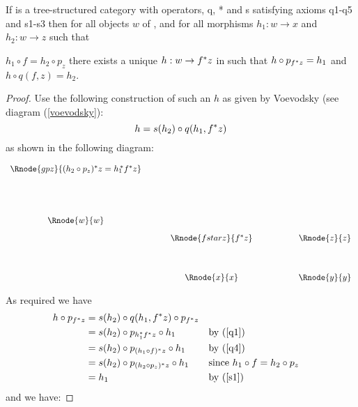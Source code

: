 \documentclass[10pt,a4paper]{scrartcl}
\begin{document}
\begin{lemma}
 If  is a tree-structured category with operators, q, * and s satisfying
axioms q1-q5 and s1-s3 then for all objects $w$ of , and for all
morphisms $h_1: w \rightarrow x$ and $h_2: w \rightarrow z$  such that

$h_1 \circ f = h_2 \circ p_z$ 
there exists a unique $h:w \rightarrow f ^* z$ in    such that
$h \circ p_{f ^* z} = h_1$ and $h \circ q(f,z) = h_2$.
\end{lemma}
\begin{proof}

Use the following construction of such an $h$ as given by Voevodsky  (see diagram (\ref{voevodsky}):
\begin{equation}
h = s(h_2) \circ q(h_1,f ^* z)
\end{equation}
as shown in the following diagram:
\vspace{3mm}
\begin{center}
\begin{equation}
\label{voevodsky}
\begin{array}{cp{0.5cm}cp{1.2cm}c}
\Rnode{gpz}{(h_2 \circ p_z)\sub z = {h_1} \kern-3pt \sub f \sub z} &&    &&   \\ [1.7cm]
\Rnode{w}{w} &&                     &&           \\ [0.3cm]
             &&\Rnode{fstarz}{f^*z} && \Rnode{z}{z}\\ [1.2cm]
             &&\Rnode{x}{x}         && \Rnode{y}{y}
\end{array}
\end{equation}
\setlength{\arrnodesepA}{3pt}
\end{center}
\noindent
As required we have 
\begin{align*}
h \circ p_{f ^* z}
                 & = s(h_2) \circ q(h_1,f ^* z) \circ p_{f ^* z} &\\
                 & = s(h_2) \circ p_{h_1 ^* f ^* z} \circ h_1 &&\mbox{by (\ref{q1})}\\
								& = s(h_2) \circ p_{(h_1 \circ f) ^* z} \circ h_1 &&\mbox{by (\ref{q4})}\\
								& = s(h_2) \circ p_{(h_2 \circ p_z) ^* z} \circ h_1 &&\mbox{since }h_1 \circ f = h_2 \circ p_z \\
                 & = h_1                                              &&\mbox{by (\ref{s1})}
\end{align*}
\noindent
and we have:


\end{proof}
\end{document}
